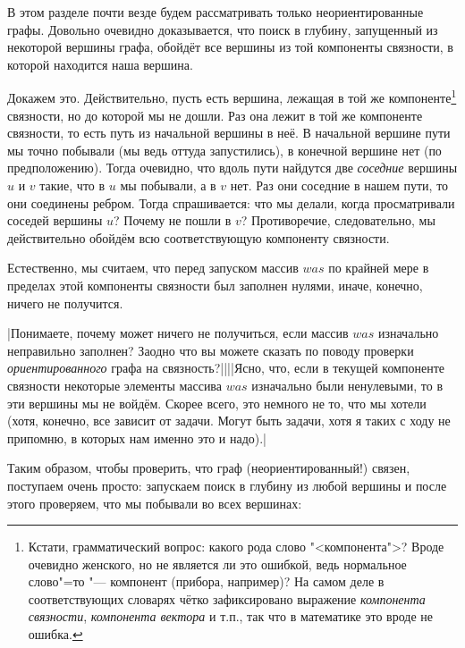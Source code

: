 В этом разделе почти везде будем рассматривать только неориентированные графы.
Довольно очевидно доказывается, что поиск в глубину, запущенный из некоторой вершины графа, обойдёт все вершины
из той компоненты связности, в которой находится наша вершина.

Докажем это. Действительно, пусть есть вершина, лежащая в той же 
компоненте\footnote{Кстати, грамматический вопрос: какого рода слово "<компонента">? Вроде очевидно 
женского, но не является ли это ошибкой, ведь нормальное слово"=то "--- компонент (прибора, например)? На самом деле в 
соответствующих словарях чётко зафиксировано выражение \textit{компонента связности}, 
\textit{компонента вектора} и т.п., так что в математике это вроде не ошибка.}
связности, но до которой мы не дошли.
Раз она лежит в той же компоненте связности, то есть путь из начальной вершины в неё. В начальной вершине пути мы точно побывали (мы ведь оттуда запустились), в конечной вершине нет (по предположению). Тогда очевидно, что вдоль пути найдутся
две \textit{соседние} вершины $u$ и $v$ такие, что в $u$ мы побывали, а в $v$ нет. Раз они соседние в нашем пути, то они
соединены ребром. Тогда спрашивается: что мы делали, когда просматривали соседей вершины $u$? Почему не пошли в $v$? 
Противоречие, следовательно, мы действительно обойдём всю соответствующую компоненту связности.


Естественно, мы считаем, что перед запуском массив $was$ по крайней мере в пределах этой компоненты связности был 
заполнен нулями, иначе, конечно, ничего не получится.

\task|Понимаете, почему может ничего не получиться, если массив $was$ изначально неправильно заполнен?
Заодно что вы можете сказать по поводу проверки \emph{ориентированного} графа на связность?||||Ясно, что, если в текущей компоненте связности некоторые элементы массива $was$ изначально были 
ненулевыми, то в эти вершины мы не войдём. Скорее всего, это немного не то, что мы хотели (хотя, конечно,
все зависит от задачи. Могут быть задачи, хотя я таких с ходу не припомню, в которых нам именно это и надо).|\label{fillwas}

Таким образом, чтобы проверить, что граф (неориентированный!) связен, поступаем очень просто: запускаем поиск в 
глубину из любой вершины и после этого проверяем, что мы побывали во всех вершинах:

